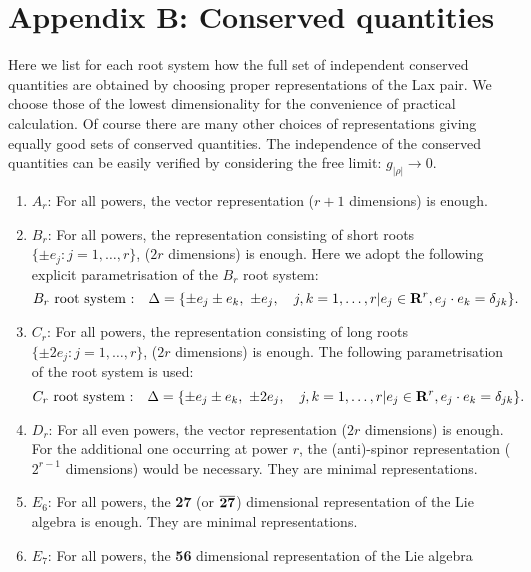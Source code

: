 \documentclass[a4paper,12pt]{article}
\begin{document}
\section*{Appendix B: Conserved quantities}
\setcounter{equation}{0}
\label{consquant}
\renewcommand{\theequation}{B.\arabic{equation}}
Here we list for each root system how the full set of independent
conserved quantities are obtained by choosing proper representations of the
Lax pair.
We choose those of the lowest dimensionality for the convenience of
practical calculation.
Of course there are many other choices of representations giving equally
good sets of conserved quantities.
The independence of the conserved quantities can be easily verified by
considering the free limit: \(g_{|\rho|}\to0\).
\begin{enumerate}
\item
\(A_r\): For all powers, the vector representation (\(r+1\) dimensions) is
enough.
\item
\(B_r\): For all powers, the  representation consisting of short roots
\(\{\pm e_j: j=1,\ldots,r\}\), (\(2r\) dimensions) is enough.
Here we adopt the following explicit
parametrisation of the \(B_r\) root system:
\begin{equation}
   B_r\ \mbox{root system :}\quad \Delta=\{\pm e_j\pm e_k,\
    \pm e_j, \quad j,k=1,\ldots,r|
   e_j\in{\bf R}^r, e_j\cdot e_k=\delta_{jk}\}.
   \label{brroots}
\end{equation}
\item
\(C_r\): For all powers, the  representation consisting of long roots
\(\{\pm 2e_j: j=1,\ldots,r\}\), (\(2r\) dimensions) is enough.
The following
parametrisation of the root system is used:
\begin{equation}
   C_r\ \mbox{root system :}\quad \Delta=\{\pm e_j\pm e_k,\
    \pm 2e_j, \quad j,k=1,\ldots,r|
   e_j\in{\bf R}^r, e_j\cdot e_k=\delta_{jk}\}.
\end{equation}
\item
\(D_r\): For all even powers, the vector representation (\(2r\) dimensions)
is enough. For the
additional one occurring at power
\(r\), the (anti)-spinor representation (\(2^{r-1}\) dimensions) would be
necessary. They are minimal representations.
\item
\(E_6\):
For all powers, the {\bf 27} (or \({\bf
\overline{27}}\)) dimensional representation of the Lie algebra
is enough. They are minimal representations.
\item
\(E_7\):
For all powers, the {\bf 56}  dimensional representation of the Lie algebra

\end{enumerate}
\end{document}
